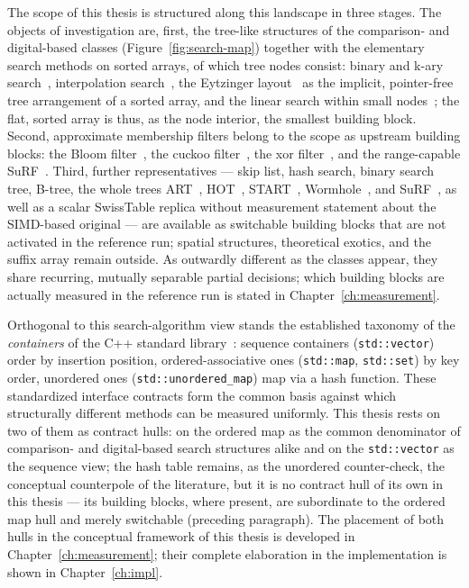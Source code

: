 \begin{nurkurz}
The scope of this thesis is structured along this landscape in three stages. The objects of investigation are,
first, the tree-like structures of the comparison- and digital-based classes (Figure~\ref{fig:search-map})
together with the elementary search methods on sorted arrays, of which tree nodes consist: binary and k-ary
search~\cite{knuth1998taocp3,schlegel2009kary}, interpolation search~\cite{perl1978interpolation}, the Eytzinger
layout~\cite{khuong2017eytzinger} as the implicit, pointer-free tree arrangement of a sorted array, and the
linear search within small nodes~\cite{leis2013art}; the flat, sorted array is thus, as the node interior, the
smallest building block. Second, approximate membership filters belong to the scope as upstream building
blocks: the Bloom filter~\cite{bloom1970}, the cuckoo filter~\cite{fan2014cuckoo}, the xor
filter~\cite{graf2020xor}, and the range-capable SuRF~\cite{zhang2018surf}. Third, further representatives ---
skip list, hash search, binary search tree, B-tree, the whole trees ART~\cite{leis2013art},
HOT~\cite{binna2018hot}, START~\cite{fent2020start}, Wormhole~\cite{wu2019wormhole}, and
SuRF~\cite{zhang2018surf}, as well as a scalar SwissTable replica without measurement statement about the
SIMD-based original --- are available as switchable building blocks that are not activated in the reference
run; spatial structures, theoretical exotics, and the suffix array remain outside. As outwardly different as
the classes appear, they share recurring, mutually separable partial decisions; which building blocks are
actually measured in the reference run is stated in Chapter~\ref{ch:measurement}.
\end{nurkurz}

Orthogonal to this search-algorithm view stands the established taxonomy of the \emph{containers} of the
C++ standard library~\cite{iso_cpp}: sequence containers (\texttt{std::vector}) order by insertion
position, ordered-associative ones (\texttt{std::map}, \texttt{std::set}) by key order, unordered ones
(\texttt{std::unordered\_map}) map via a hash function. These standardized interface contracts form the
common basis against which structurally different methods can be measured uniformly. This thesis rests
on two of them as contract hulls: on the ordered map as the common denominator of comparison- and
digital-based search structures alike and on the \texttt{std::vector} as the sequence view; the hash
table remains, as the unordered counter-check, the conceptual counterpole of the literature, but it is no
contract hull of its own in this thesis --- its building blocks, where present, are subordinate to the
ordered map hull and merely switchable (preceding paragraph). The placement of both hulls in the
conceptual framework of this thesis is developed in Chapter~\ref{ch:measurement}; their complete
elaboration in the implementation is shown in Chapter~\ref{ch:impl}.

